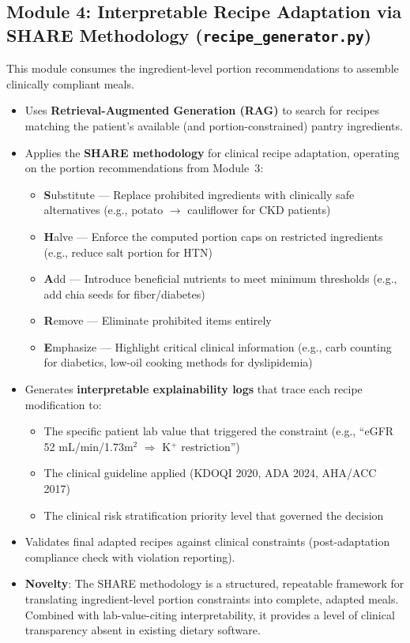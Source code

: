 \documentclass[a4paper,12pt]{article}
\begin{document}
\subsection*{Module 4: Interpretable Recipe Adaptation via SHARE Methodology (\texttt{recipe\_generator.py})}

This module consumes the ingredient-level portion recommendations to assemble clinically compliant meals.

\begin{itemize}[itemsep=0.3em]
    \item Uses \textbf{Retrieval-Augmented Generation (RAG)} to search for recipes matching the patient's available (and portion-constrained) pantry ingredients.
    \item Applies the \textbf{SHARE methodology} for clinical recipe adaptation, operating on the portion recommendations from Module~3:
    \begin{itemize}
        \item \textbf{S}ubstitute --- Replace prohibited ingredients with clinically safe alternatives (e.g., potato $\rightarrow$ cauliflower for CKD patients)
        \item \textbf{H}alve --- Enforce the computed portion caps on restricted ingredients (e.g., reduce salt portion for HTN)
        \item \textbf{A}dd --- Introduce beneficial nutrients to meet minimum thresholds (e.g., add chia seeds for fiber/diabetes)
        \item \textbf{R}emove --- Eliminate prohibited items entirely
        \item \textbf{E}mphasize --- Highlight critical clinical information (e.g., carb counting for diabetics, low-oil cooking methods for dyslipidemia)
    \end{itemize}
    \item Generates \textbf{interpretable explainability logs} that trace each recipe modification to:
    \begin{itemize}
        \item The specific patient lab value that triggered the constraint (e.g., ``eGFR 52 mL/min/1.73m$^2$ $\Rightarrow$ K$^+$ restriction'')
        \item The clinical guideline applied (KDOQI 2020, ADA 2024, AHA/ACC 2017)
        \item The clinical risk stratification priority level that governed the decision
    \end{itemize}
    \item Validates final adapted recipes against clinical constraints (post-adaptation compliance check with violation reporting).
    \item \textbf{Novelty}: The SHARE methodology is a structured, repeatable framework for translating ingredient-level portion constraints into complete, adapted meals. Combined with lab-value-citing interpretability, it provides a level of clinical transparency absent in existing dietary software.
\end{itemize}
\end{document}
